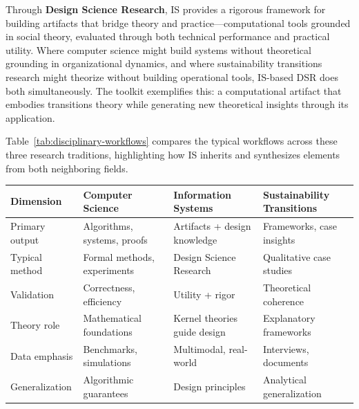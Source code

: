 \documentclass[../main.tex]{subfiles}
\begin{document}
Through \textbf{Design Science Research}, IS provides a rigorous framework for building artifacts that bridge theory and practice---computational tools grounded in social theory, evaluated through both technical performance and practical utility. Where computer science might build systems without theoretical grounding in organizational dynamics, and where sustainability transitions research might theorize without building operational tools, IS-based DSR does both simultaneously. The \RoleBox{} toolkit exemplifies this: a computational artifact that embodies transitions theory while generating new theoretical insights through its application.

Table~\ref{tab:disciplinary-workflows} compares the typical workflows across these three research traditions, highlighting how IS inherits and synthesizes elements from both neighboring fields.

\tableminimal
\begin{center}
\small
\begin{tabular}{@{}p{2.2cm}p{3.3cm}p{3.3cm}p{3.3cm}@{}}
\toprule
\textbf{Dimension} & \textbf{Computer Science} & \textbf{Information Systems} & \textbf{Sustainability Transitions} \\
\midrule
Primary output & Algorithms, systems, proofs & Artifacts + design knowledge & Frameworks, case insights \\
Typical method & Formal methods, experiments & Design Science Research & Qualitative case studies \\
Validation & Correctness, efficiency & Utility + rigor & Theoretical coherence \\
Theory role & Mathematical foundations & Kernel theories guide design & Explanatory frameworks \\
Data emphasis & Benchmarks, simulations & Multimodal, real-world & Interviews, documents \\
Generalization & Algorithmic guarantees & Design principles & Analytical generalization \\
\bottomrule
\end{tabular}
\label{tab:disciplinary-workflows}
\end{center}
\normalsize



\end{document}
